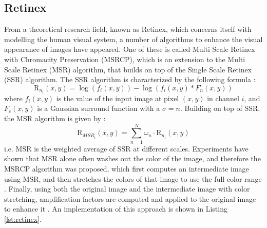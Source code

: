 \documentclass[sigconf]{acmart}
\begin{document}
\subsection{Retinex}\label{sec:retinex}
From a theoretical research field, known as Retinex, which concerns itself with modelling the human visual system, a number of algorithms to enhance the visual appearance of images have appeared. One of these is called Multi Scale Retinex with Chromacity Preservation (MSRCP), which is an extension to the Multi Scale Retinex (MSR) algorithm, that builds on top of the Single Scale Retinex (SSR) algorithm. The SSR algorithm is characterized by the following formula \cite{petro2014multiscale,barnard1998investigations}:
\begin{equation}
	\text{R}_{n_i}(x,y) = \log(f_i(x,y)) - \log(f_i(x,y) \ast F_n(x,y))
\end{equation}
where $f_i(x,y)$ is the value of the input image at pixel $(x,y)$ in channel $i$, and $F_c(x,y)$ is a Gaussian surround function with a $\sigma = n$. Building on top of SSR, the MSR algorithm is given by \cite{petro2014multiscale,barnard1998investigations}:
\begin{equation}
	\text{R}_{MSR_i}(x,y) = \sum_{n=1}^{N} \omega_n \cdot \text{R}_{n_i}(x,y)
\end{equation}
i.e. MSR is the weighted average of SSR at different scales. Experiments have shown that MSR alone often washes out the color of the image, and therefore the MSRCP algorithm was proposed, which first computes an intermediate image using MSR, and then stretches the colors of that image to use the full color range \cite{petro2014multiscale}. Finally, using both the original image and the intermediate image with color stretching, amplification factors are computed and applied to the original image to enhance it \cite{petro2014multiscale}. An implementation of this approach is shown in Listing \ref{lst:retinex}.
\end{document}
